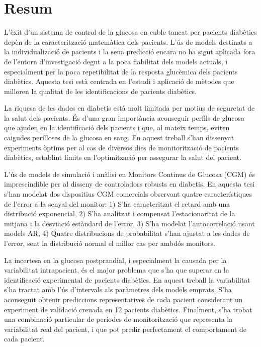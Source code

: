 \chapter*{Resum}
\label{sec:Resum}

L'\`{e}xit d'un sistema de control de la glucosa en cuble tancat per pacients diab\`{e}tics dep\`{e}n de la caracteritzaci\'{o} matem\`{a}tica dels pacients. L'\'{u}s de models destinats a la individualizaci\'{o} de pacients i la seua predicci\'{o} encara no ha sigut aplicada fora de l'entorn d'investigaci\'{o} degut a la poca fiabilitat dels models actuals, i especialment per la poca repetibilitat de la resposta gluc\`{e}mica dels pacients diab\`{e}tics. Aquesta tesi est\`{a} centrada en l'estudi i aplicaci\'{o} de m\`{e}todes que milloren la qualitat de les identificacions de pacients diab\`{e}tics.

La riquesa de les dades en diabetis est\`{a} molt limitada per motius de seguretat de la salut dels pacients. \'{E}s d'una gran import\`{a}ncia aconseguir perfils de glucosa que ajuden en la identificaci\'{o} dels pacients i que, al mateix temps, eviten caigudes perilloses de la glucosa en sang. En aquest treball s'han dissenyat experiments \`{o}ptims per al cas de diversos dies de monitoritzaci\'{o} de pacients diab\`{e}tics, establint l\'{i}mits en l'optimitzaci\'{o} per assegurar la salut del pacient.

L'\'{u}s de models de simulaci\'{o} i an\`{a}lisi en Monitors Continus de Glucosa (CGM) \'{e}s imprescindible per al disseny de controladors robusts en diabetis. En aquesta tesi s'han modelat dos dispositius CGM comercials observant quatre caracter\'{i}stiques de l'error a la senyal del monitor: 1) S'ha caracteritzat el retard amb una distribuci\'{o} exponencial, 2) S'ha analitzat i compensat l'estacionaritat de la mitjana i la desviaci\'{o} est\`{a}ndard de l'error, 3) S'ha modelat l'autocorrelaci\'{o} usant models AR, 4) Quatre distribucions de probabilitat s'han ajustat a les dades de l'error, sent la distribuci\'{o} normal el millor cas per ambd\'{o}s monitors.

La incertesa en la glucosa postprandial, i especialment la causada per la variabilitat intrapacient, \'{e}s el major problema que s'ha que superar en la identificaci\'{o} experimental de pacients diab\`{e}tics. En aquest treball la variabilitat s'ha tractat amb l'\'{u}s d'intervals als par\`{a}metres dels models emprats. S'ha aconseguit obtenir prediccions representatives de cada pacient considerant un experiment de validaci\'{o} creuada en 12 pacients diab\`{e}tics. Finalment, s'ha trobat una combinaci\'{o} particular de per\'{i}odes de monitoritzaci\'{o} que representa la variabilitat real del pacient, i que pot predir perfectament el comportament de cada pacient.

